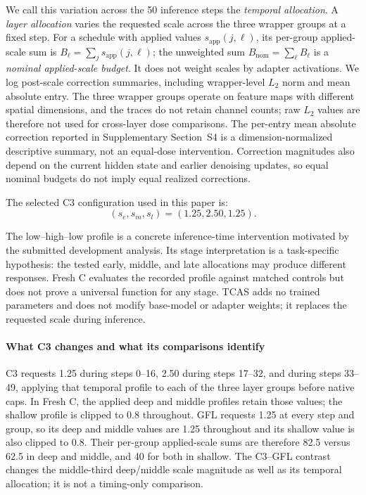 \documentclass[times,twocolumn,final]{elsarticle}
\providecommand{\DIFadd}[1]{{\protect\color{blue} \sf #1}} %
\providecommand{\DIFaddbegin}{} %
\providecommand{\DIFaddend}{} %
\begin{document}
\DIFaddbegin \DIFadd{We call this variation across the 50 inference steps the \emph{temporal allocation}. A \emph{layer allocation} varies the requested scale across the three wrapper groups at a fixed step. For a schedule with applied values $s_{\mathrm{app}}(j,\ell)$, its per-group applied-scale sum is $B_\ell=\sum_j s_{\mathrm{app}}(j,\ell)$; the unweighted sum $B_{\mathrm{nom}}=\sum_\ell B_\ell$ is a \emph{nominal applied-scale budget}. It does not weight scales by adapter activations. We log post-scale correction summaries, including wrapper-level $L_2$ norm and mean absolute entry. The three wrapper groups operate on feature maps with different spatial dimensions, and the traces do not retain channel counts; raw $L_2$ values are therefore not used for cross-layer dose comparisons. The per-entry mean absolute correction reported in Supplementary Section~S4 is a dimension-normalized descriptive summary, not an equal-dose intervention. Correction magnitudes also depend on the current hidden state and earlier denoising updates, so equal nominal budgets do not imply equal realized corrections.
}

\DIFaddend The selected C3 configuration used in this paper is:
\begin{equation}
(s_e, s_m, s_l) = (1.25, 2.50, 1.25).
\end{equation}

  \DIFaddbegin \DIFadd{The low--high--low profile is a concrete inference-time intervention motivated by the submitted development analysis. Its stage interpretation is a task-specific hypothesis: the tested early, middle, and late allocations may produce different responses. Fresh C evaluates the recorded profile against matched controls but does not prove a universal function for any stage. TCAS adds no trained }\DIFaddend parameters and does not modify   \DIFaddbegin \DIFadd{base-model }\DIFaddend or adapter weights; it   \DIFaddbegin \DIFadd{replaces the requested scale during inference}\DIFaddend .

  \DIFaddbegin \paragraph{What C3 changes and what its comparisons identify}
\DIFadd{C3 requests 1.25 during steps 0--16, 2.50 during steps 17--32, }\DIFaddend and   \DIFaddbegin \DIFadd{1.25 during steps 33--49, applying that temporal profile to each of the three layer groups before native caps. In Fresh C, the applied deep and middle profiles retain those values; the shallow profile is clipped to 0.8 throughout. GFL requests 1.25 at every step and group, so its deep and middle values are 1.25 throughout and its shallow value is also clipped to 0.8. Their per-group applied-scale sums are therefore 82.5 versus 62.5 in deep and middle, and 40 for both in shallow. The C3--GFL contrast changes the middle-third deep/middle scale magnitude as well as its temporal allocation; it is not a timing-only comparison.
}\DIFaddend 
\end{document}
